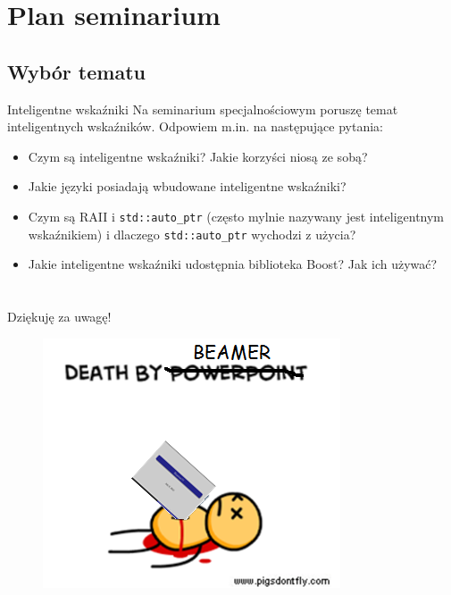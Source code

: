\section{Plan seminarium}
\subsection{Wybór tematu}
\begin{frame}{Inteligentne wskaźniki}
	Na seminarium specjalnościowym poruszę temat inteligentnych wskaźników.
	Odpowiem m.in. na następujące pytania: \pause
	\begin{itemize}
		\item Czym są inteligentne wskaźniki? Jakie korzyści niosą ze sobą? \pause
		\item Jakie języki posiadają wbudowane inteligentne wskaźniki?       \pause
		\item Czym są RAII i \texttt{std::auto\_ptr} (często mylnie nazywany jest
		  inteligentnym wskaźnikiem) i dlaczego \texttt{std::auto\_ptr}
		  wychodzi z użycia?              \pause
		\item Jakie inteligentne wskaźniki udostępnia biblioteka Boost?  
		  Jak ich używać?
	\end{itemize}
\end{frame}



\section{}
\begin{frame}
  \begin{center}
    \huge
    Dziękuję za uwagę!
  \end{center}
  \bigskip
  
      \begin{figure}
      \includegraphics[scale=0.5]{img/death-by-beamer}
    \end{figure}
 

\end{frame}


